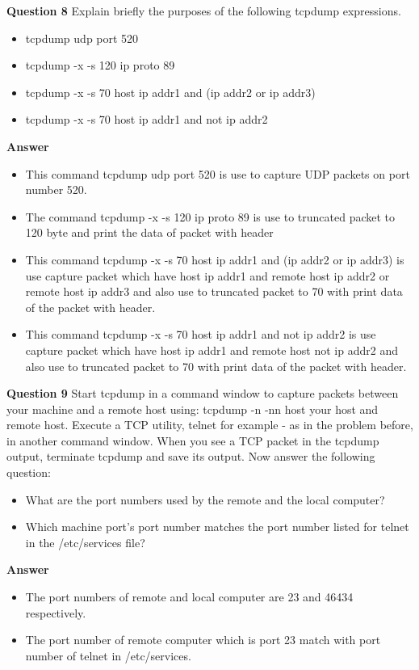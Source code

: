 \documentclass[14pt]{extarticle}
\begin{document}
    \noindent
    \textbf{\large Question 8}
    Explain briefly the purposes of the following tcpdump expressions.
    \begin{itemize}
        \item tcpdump udp port 520
        \item tcpdump -x -s 120 ip proto 89
        \item tcpdump -x -s 70 host ip addr1 and (ip addr2 or ip addr3)
        \item tcpdump -x -s 70 host ip addr1 and not ip addr2
    \end{itemize}
    \textbf{\large Answer}
    \begin{itemize}
        \item This command \textsf{tcpdump udp port 520} is use to capture UDP packets on port number 520.
        \item The command \textsf{tcpdump -x -s 120 ip proto 89} is use to truncated packet to 120 byte and print the data of packet with header
        \item This command \textsf{tcpdump -x -s 70 host ip addr1 and (ip addr2 or ip addr3)} is use capture packet which have host ip addr1 and remote host ip addr2 or remote host ip addr3 
        and also use to truncated packet to 70 with print data of the packet with header.
        \item This command \textsf{tcpdump -x -s 70 host ip addr1 and not ip addr2} is use capture packet which have host ip addr1 and remote host not ip addr2
        and also use to truncated packet to 70 with print data of the packet with header.
    \end{itemize}
    \vspace{1cm}

    \noindent
    \textbf{\large Question 9}
    Start tcpdump in a command window to capture packets between your machine and a remote host using:
    tcpdump -n -nn host your host and remote host. Execute a TCP utility, telnet for example - as in the
    problem before, in another command window. When you see a TCP packet in the tcpdump output,
    terminate tcpdump and save its output. Now answer the following question:
    \begin{itemize}
        \item What are the port numbers used by the remote and the local computer?
        \item Which machine port's port number matches the port number listed for telnet in the /etc/services file?
    \end{itemize}
    \textbf{\large Answer}
    \begin{itemize}
        \item The port numbers of remote and local computer are 23 and 46434 respectively.
        \item The port number of remote computer which is port 23 match with port number of telnet in /etc/services.
    \end{itemize}
    \vspace{1cm}
\end{document}
